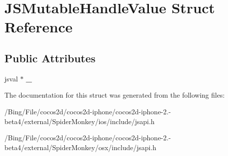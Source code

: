 \hypertarget{struct_j_s_mutable_handle_value}{\section{J\-S\-Mutable\-Handle\-Value Struct Reference}
\label{struct_j_s_mutable_handle_value}
}
\subsection*{Public Attributes}
\begin{DoxyCompactItemize}
\item 
\hypertarget{struct_j_s_mutable_handle_value_a8ffe1f8c7bc9861bfa09f65491250c5c}{jsval $\ast$ {\bfseries \-\_\-}}\label{struct_j_s_mutable_handle_value_a8ffe1f8c7bc9861bfa09f65491250c5c}

\end{DoxyCompactItemize}


The documentation for this struct was generated from the following files\-:\begin{DoxyCompactItemize}
\item 
/\-Bing/\-File/cocos2d/cocos2d-\/iphone/cocos2d-\/iphone-\/2.-\/beta4/external/\-Spider\-Monkey/ios/include/jsapi.\-h\item 
/\-Bing/\-File/cocos2d/cocos2d-\/iphone/cocos2d-\/iphone-\/2.-\/beta4/external/\-Spider\-Monkey/osx/include/jsapi.\-h\end{DoxyCompactItemize}

